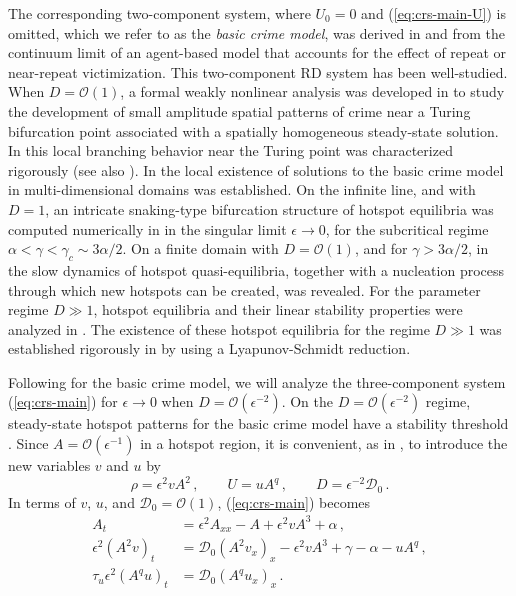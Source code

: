 \documentclass{article}%
\newcommand{\bsub}{\begin{subequations}}
\newcommand{\esub}{\end{subequations}$\!$}
\begin{document}
The corresponding two-component system, where $U_0=0$ and
(\ref{eq:crs-main-U}) is omitted, which we refer to as the {\em basic
  crime model}, was derived in \cite{s_1} and \cite{s_3} from the
continuum limit of an agent-based model that accounts for the effect
of repeat or near-repeat victimization. This two-component RD system
has been well-studied. When $D={\mathcal O}(1)$, a formal weakly
nonlinear analysis was developed in \cite{s_2} to study the
development of small amplitude spatial patterns of crime near a Turing
bifurcation point associated with a spatially homogeneous steady-state
solution. In \cite{ccm} this local branching behavior near the Turing
point was characterized rigorously (see also \cite{GWY}). In \cite{rb}
the local existence of solutions to the basic crime model in
multi-dimensional domains was established.  On the infinite line, and
with $D=1$, an intricate snaking-type bifurcation structure of hotspot
equilibria was computed numerically in \cite{lf} in the singular limit
$\epsilon\to 0$, for the subcritical regime
$\alpha<\gamma<\gamma_c\sim {3\alpha/2}$. On a finite domain with
$D={\mathcal O}(1)$, and for $\gamma>{3\alpha/2}$, in \cite{tw} the
slow dynamics of hotspot quasi-equilibria, together with a nucleation
process through which new hotspots can be created, was revealed. For
the parameter regime $D\gg 1$, hotspot equilibria and their linear
stability properties were analyzed in \cite{kww_crime}. The existence
of these hotspot equilibria for the regime $D\gg 1$ was established
rigorously in \cite{bww} by using a Lyapunov-Schmidt reduction.

Following \cite{kww_crime} for the basic crime model, we will analyze
the three-component system (\ref{eq:crs-main}) for $\epsilon\to 0$
when $D={\mathcal O}(\epsilon^{-2})$. On the $D={\mathcal
  O}(\epsilon^{-2})$ regime, steady-state hotspot patterns for the
basic crime model have a stability threshold \cite{kww_crime}.  Since
$A={\mathcal O}(\epsilon^{-1})$ in a hotspot region, it is convenient,
as in \cite{kww_crime}, to introduce the new variables $v$ and $u$ by
\begin{equation}\label{ss:new_var}
\rho=\epsilon^2 v A^{2}\,, \qquad U=uA^{q} \,, \qquad  
D= \epsilon^{-2} {\mathcal D}_{0} \,.
\end{equation}
In terms of $v$, $u$, and ${\mathcal D}_0={\mathcal O}(1)$,
(\ref{eq:crs-main}) becomes 
\bsub\label{eq:pol-main}
\begin{align}
A_{t} & =\epsilon^{2}A_{xx}-A+\epsilon^{2}vA^{3}+\alpha\,,
 \label{eq:pol-main-A}\\
\epsilon^{2}\left(A^{2}v\right)_{t} & ={\mathcal D}_{0}\left(A^{2}v_{x}\right)_{x}
-\epsilon^{2}vA^{3}+\gamma-\alpha-uA^{q}\,, \label{eq:pol-main-v}\\ 
\tau_{u}\epsilon^{2}\left(A^{q}u\right)_{t}
& ={\mathcal D}_{0}\left(A^{q}u_{x}\right)_{x} \,. \label{eq:pol-main-u}
\end{align}
\esub 
\end{document}
